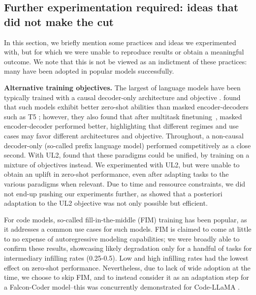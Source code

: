 \documentclass{article}
\begin{document}
\subsection{Further experimentation required: ideas that did not make the cut}
\label{sec:donotwork}

In this section, we briefly mention some practices and ideas we experimented with, but for which we were unable to reproduce results or obtain a meaningful outcome. We note that this is not be viewed as an indictment of these practices: many have been adopted in popular models successfully. 

\textbf{Alternative training objectives.} The largest of language models have been typically trained with a causal decoder-only architecture and objective \citep{brown2020gpt3, gopher, palm}. \citet{wang2022language} found that such models exhibit better zero-shot abilities than masked encoder-decoders such as T5 \citep{raffel2019t5}; however, they also found that after multitask finetuning~\citep{Sanh2021MultitaskPT}, masked encoder-decoder performed better, highlighting that different regimes and use cases may favor different architectures and objective. Throughout, a non-causal decoder-only (so-called prefix language model) performed competitively as a close second. With UL2, \citet{tay2022ul2} found that these paradigms could be unified, by training on a mixture of objectives instead. We experimented with UL2, but were unable to obtain an uplift in zero-shot performance, even after adapting tasks to the various paradigms when relevant. Due to time and ressource constraints, we did not end-up pushing our experiments further, as \citet{tay2022transcending} showed that a posteriori adaptation to the UL2 objective was not only possible but efficient.

For code models, so-called fill-in-the-middle (FIM) training \citep{bavarian2022efficient} has been popular, as it addresses a common use cases for such models. FIM is claimed to come at little to no expense of autoregressive modeling capabilities; we were broadly able to confirm these results, showcasing likely degradation only for a handful of tasks for intermediary infilling rates (0.25-0.5). Low and high infilling rates had the lowest effect on zero-shot performance. Nevertheless, due to lack of wide adoption at the time, we choose to skip FIM, and to instead consider it as an adaptation step for a Falcon-Coder model--this was concurrently demonstrated for Code-LLaMA \citep{roziere2023code}. 
\end{document}
